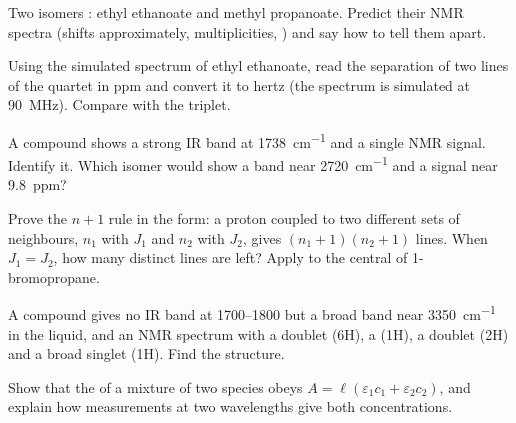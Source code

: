 \begin{exercise}[$\star\star$]\label{exo:b1:structure-spectroscopy:7}
Two isomers : ethyl ethanoate and methyl propanoate. Predict
their NMR spectra (shifts approximately, multiplicities, )
and say how to tell them apart.
\end{exercise}

\begin{exercise}[$\star\star$]\label{exo:b1:structure-spectroscopy:8}
Using the simulated spectrum of ethyl ethanoate, read the separation of
two lines of the quartet in ppm and convert it to hertz (the spectrum is
simulated at \qty{90}{MHz}). Compare with the triplet.
\end{exercise}

\begin{exercise}[$\star\star$]\label{exo:b1:structure-spectroscopy:9}
A compound  shows a strong IR band at \qty{1738}{cm^{-1}} and a
single NMR signal. Identify it. Which isomer would show a band near
\qty{2720}{cm^{-1}} and a signal near \qty{9.8}{ppm}?
\end{exercise}

\begin{exercise}[$\star\star\star$]\label{exo:b1:structure-spectroscopy:10}
Prove the $n + 1$ rule in the form: a proton coupled to two different
sets of neighbours, $n_1$ with $J_1$ and $n_2$ with $J_2$, gives $(n_1 +
1)(n_2 + 1)$ lines. When $J_1 = J_2$, how many distinct lines are left?
Apply to the central  of 1-bromopropane.
\end{exercise}

\begin{exercise}[$\star\star\star$]\label{exo:b1:structure-spectroscopy:11}
A compound  gives no IR band at 1700--1800 but a broad band
near \qty{3350}{cm^{-1}} in the liquid, and an NMR spectrum with a doublet
(6H), a  (1H), a doublet (2H) and a broad singlet (1H). Find
the structure.
\end{exercise}

\begin{exercise}[$\star\star\star$]\label{exo:b1:structure-spectroscopy:12}
Show that the  of a mixture of two species obeys $A = \ell(\varepsilon_1c_1
+ \varepsilon_2c_2)$, and explain how measurements at two wavelengths give
both concentrations.
\end{exercise}

